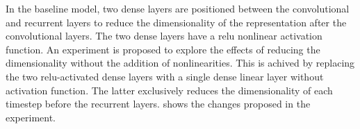 
In the baseline model, two dense layers are positioned
between the convolutional and recurrent layers to reduce the
dimensionality of the representation after the convolutional
layers. The two dense layers have a \gls{relu} nonlinear
activation function. An experiment is proposed to explore
the effects of reducing the dimensionality without the
addition of nonlinearities. This is achived by replacing the
two \gls{relu}-activated dense layers with a single dense
linear layer without activation function. The latter
exclusively reduces the dimensionality of each timestep
before the recurrent layers.  shows the
changes proposed in the experiment. 

